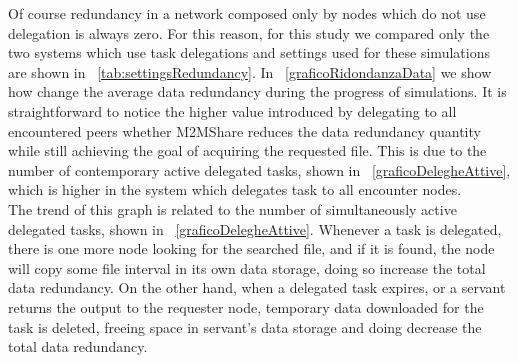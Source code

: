 Of course redundancy in a network composed only by nodes which do not use delegation is always zero. For this reason, for this study we compared only the two systems which use task delegations and settings used for these simulations are shown in \tablename~\ref{tab:settingsRedundancy}. In \figurename~\ref{graficoRidondanzaData} we show how change the average data redundancy during the progress of simulations. It is straightforward to notice the higher value introduced by delegating to all encountered peers whether M2MShare reduces the data redundancy quantity while still achieving the goal of acquiring the requested file. This is due to the number of contemporary active delegated tasks, shown in \figurename~\ref{graficoDelegheAttive}, which is higher in the system which delegates task to all encounter nodes. 
\\
The trend of this graph is related to the number of simultaneously active delegated tasks, shown in \figurename~\ref{graficoDelegheAttive}. Whenever a task is delegated, there is one more node looking for the searched file, and if it is found, the node will copy some file interval in its own data storage, doing so increase the total data redundancy. On the other hand, when a delegated task expires, or a servant returns the output to the requester node, temporary data downloaded for the task is deleted, freeing space in servant's data storage and doing decrease the total data redundancy.


